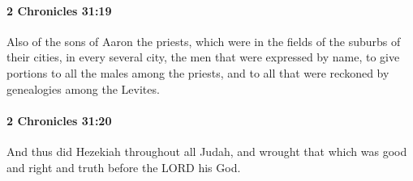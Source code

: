 		\paragraph{2 Chronicles 31:19} %
			\label{2CHRONICLES-31-19}

			Also of the sons of Aaron the priests, which were in the fields of the suburbs of their cities, in every several city, the men that were expressed by name, to give portions to all the males among the priests, and to all that were reckoned by genealogies among the Levites.


		\paragraph{2 Chronicles 31:20} %
			\label{2CHRONICLES-31-20}

			And thus did Hezekiah throughout all Judah, and wrought that which was good and right and truth before the LORD his God.

